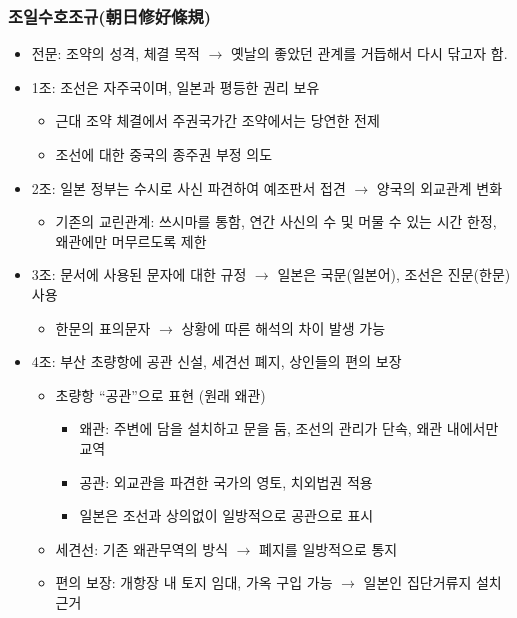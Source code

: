 \subsubsection*{조일수호조규(朝日修好條規)}

\begin{itemize}
    \item 전문: 조약의 성격, 체결 목적 $\rightarrow$ 옛날의 좋았던 관계를 거듭해서 다시 닦고자 함.
    \item 1조: 조선은 자주국이며, 일본과 평등한 권리 보유
    \begin{itemize}
        \item 근대 조약 체결에서 주권국가간 조약에서는 당연한 전제
        \item 조선에 대한 중국의 종주권 부정 의도
    \end{itemize}
    \item 2조: 일본 정부는 수시로 사신 파견하여 예조판서 접견 $\rightarrow$ 양국의 외교관계 변화
    \begin{itemize}
        \item 기존의 교린관계: 쓰시마를 통함, 연간 사신의 수 및 머물 수 있는 시간 한정, 왜관에만 머무르도록 제한
    \end{itemize}
    \item 3조: 문서에 사용된 문자에 대한 규정 $\rightarrow$ 일본은 국문(일본어), 조선은 진문(한문) 사용
    \begin{itemize}
        \item 한문의 표의문자 $\rightarrow$ 상황에 따른 해석의 차이 발생 가능
    \end{itemize}
    \item 4조: 부산 초량항에 공관 신설, 세견선 폐지, 상인들의 편의 보장
    \begin{itemize}
        \item 초량항 ``공관''으로 표현 (원래 왜관)
        \begin{itemize}
            \item 왜관: 주변에 담을 설치하고 문을 둠, 조선의 관리가 단속, 왜관 내에서만 교역
            \item 공관: 외교관을 파견한 국가의 영토, 치외법권 적용
            \item 일본은 조선과 상의없이 일방적으로 공관으로 표시
        \end{itemize}
        \item 세견선: 기존 왜관무역의 방식 $\rightarrow$ 폐지를 일방적으로 통지
        \item 편의 보장: 개항장 내 토지 임대, 가옥 구입 가능 $\rightarrow$ 일본인 집단거류지 설치 근거

\end{itemize}
\end{itemize}
